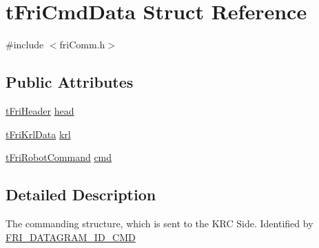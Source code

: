 \hypertarget{structtFriCmdData}{\section{t\-Fri\-Cmd\-Data \-Struct \-Reference}
\label{structtFriCmdData}
}


{\ttfamily \#include $<$fri\-Comm.\-h$>$}

\subsection*{\-Public \-Attributes}
\begin{DoxyCompactItemize}
\item 
\hyperlink{structtFriHeader}{t\-Fri\-Header} \hyperlink{structtFriCmdData_a4b495c82351202f5fbfaa3b4ea107731}{head}
\item 
\hyperlink{structtFriKrlData}{t\-Fri\-Krl\-Data} \hyperlink{structtFriCmdData_a872ea51ba042c1afd29f325176108505}{krl}
\item 
\hyperlink{structtFriRobotCommand}{t\-Fri\-Robot\-Command} \hyperlink{structtFriCmdData_a795067adcf52998f477b7aabd5b09906}{cmd}
\end{DoxyCompactItemize}


\subsection{\-Detailed \-Description}
\-The commanding structure, which is sent to the \-K\-R\-C \-Side. \-Identified by \hyperlink{friComm_8h_a32bb8d069d88fa398fe3ab194bbba547}{\-F\-R\-I\-\_\-\-D\-A\-T\-A\-G\-R\-A\-M\-\_\-\-I\-D\-\_\-\-C\-M\-D} 

